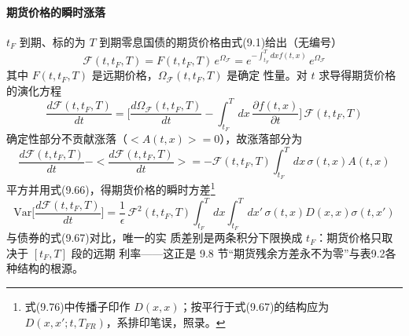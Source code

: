 \paragraph{期货价格的瞬时涨落}
$t_F$ 到期、标的为 $T$ 到期零息国债的期货价格由式(9.1)给出（无编号）
\begin{equation*}
\mathcal{F}(t,t_F,T)=F(t,t_F,T)\,e^{\Omega_{\mathcal{F}}}
=e^{-\int_{t_F}^{T}dxf(t,x)}\,e^{\Omega_{\mathcal{F}}}
\end{equation*}
其中 $F(t,t_F,T)$ 是远期价格，$\Omega_{\mathcal{F}}(t,t_F,T)$ 是确定
性量。对 $t$ 求导得期货价格的演化方程
\begin{equation*}
\frac{d\mathcal{F}(t,t_F,T)}{dt}
=\biggl[\frac{d\Omega_{\mathcal{F}}(t,t_F,T)}{dt}
-\int_{t_F}^{T}dx\,\frac{\partial f(t,x)}{\partial t}\biggr]\,
\mathcal{F}(t,t_F,T)\tag{9.74}
\end{equation*}
确定性部分不贡献涨落（$<A(t,x)>=0$），故涨落部分为
\begin{equation*}
\frac{d\mathcal{F}(t,t_F,T)}{dt}-<\frac{d\mathcal{F}(t,t_F,T)}{dt}>
=-\mathcal{F}(t,t_F,T)\int_{t_F}^{T}dx\,\sigma(t,x)A(t,x)\tag{9.75}
\end{equation*}
平方并用式(9.66)，得期货价格的瞬时方差\footnote{式(9.76)中传播子印作 $D(x,x)$；按平行于式(9.67)的结构应为
$D(x,x';t,T_{FR})$，系排印笔误，照录。}
\begin{equation*}
\mathrm{Var}\biggl[\frac{d\mathcal{F}(t,t_F,T)}{dt}\biggr]
=\frac{1}{\epsilon}\,\mathcal{F}^2(t,t_F,T)
\int_{t_F}^{T}dx\int_{t_F}^{T}dx'\,\sigma(t,x)D(x,x)\sigma(t,x')
\tag{9.76}
\end{equation*}与债券的式(9.67)对比，唯一的实
质差别是两条积分下限换成 $t_F$：期货价格只取决于 $[t_F,T]$ 段的远期
利率——这正是 9.8 节“期货残余方差永不为零”与表9.2各种结构的根源。

